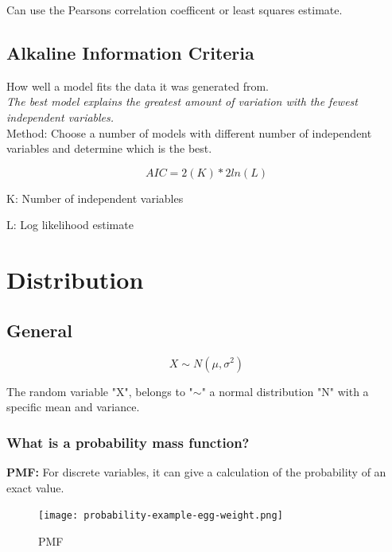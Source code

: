 \documentclass[11pt]{scrartcl} %
\begin{document}
Can use the Pearsons correlation coefficent or least squares estimate.

\subsection{Alkaline Information Criteria}

How well a model fits the data it was generated from.\\

\textit{The best model explains the greatest amount of variation with the fewest independent variables.}\\

Method: Choose a number of models with different number of independent variables and determine which is the best.

\begin{equation}
	AIC = 2(K) * 2ln(L)
\end{equation}

K: Number of independent variables

L: Log likelihood estimate

\section{Distribution}

\subsection{General}

\begin{equation}
	X \sim N(\mu,\sigma^2)
\end{equation}

The random variable "X", belongs to "\(\sim\)" a normal distribution "N" with a specific mean and variance.

\subsubsection{What is a probability mass function?}

\textbf{PMF:} For discrete variables, it can give a calculation of the probability of an exact value.

\begin{figure}[h] %
	\centering
	\texttt{[image: probability-example-egg-weight.png]} %
	\caption{PMF}
\end{figure}
\end{document}
